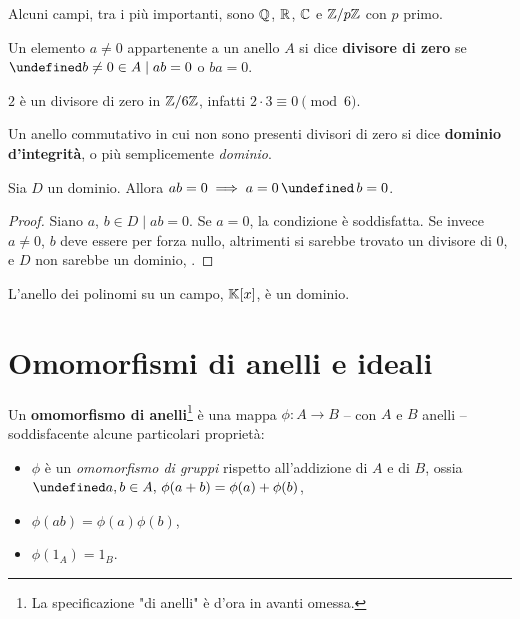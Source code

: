 \documentclass[a4paper]{article}
\let\oldforall\forall
\let\forall\undefined
\DeclareMathOperator{\forall}{\oldforall}
\let\oldexists\exists
\let\exists\undefined
\DeclareMathOperator{\exists}{\oldexists}
\let\oldlor\lor
\let\lor\undefined
\DeclareMathOperator{\lor}{\oldlor}
\begin{document}
\begin{example}
    Alcuni campi, tra i più importanti, sono $\mathbb{Q}$, $\mathbb{R}$, $\mathbb{C}$ e $\mathbb{Z}/p\mathbb{Z}$ con
    $p$ primo.
\end{example}

\begin{definition}
    Un elemento $a \neq 0$ appartenente a un anello $A$ si dice \textbf{divisore di zero} se
    $\exists b \neq 0 \in A \mid ab = 0$ o $ba = 0$.
\end{definition}

\begin{example}
    $2$ è un divisore di zero in $\mathbb{Z}/6\mathbb{Z}$, infatti $2 \cdot 3 \equiv 0 \pmod 6.$
\end{example}

\begin{definition}
    Un anello commutativo in cui non sono presenti divisori di zero si dice \textbf{dominio d'integrità},
    o più semplicemente \textit{dominio}.
\end{definition}

\begin{proposition}
    Sia $D$ un dominio. Allora $ab=0 \implies a=0 \,\lor\, b=0$.
\end{proposition}

\begin{proof}
    Siano $a$, $b \in D \mid ab = 0$. Se $a=0$, la condizione è soddisfatta.
    Se invece $a \neq 0$, $b$ deve essere per forza nullo, altrimenti si
    sarebbe trovato un divisore di $0$, e $D$ non sarebbe un dominio, \Lightning.
\end{proof}

\begin{example}
    L'anello dei polinomi su un campo, $\mathbb{K}[x]$, è un dominio.
\end{example}

\section{Omomorfismi di anelli e ideali}

\begin{definition}
    Un \textbf{omomorfismo di anelli}\footnote{La specificazione "di anelli" è d'ora in avanti omessa.} è una mappa $\phi : A \to B$ -- con
    $A$ e $B$ anelli -- soddisfacente alcune particolari proprietà:

    \begin{itemize}
        \item $\phi$ è un \textit{omomorfismo di gruppi} rispetto all'addizione
              di $A$ e di $B$, ossia $\forall a, b \in A, \, \phi(a+b)=\phi(a)+\phi(b)$,
        \item $\phi(ab)=\phi(a)\phi(b)$,
        \item $\phi(1_A)=1_B$.
    \end{itemize}
\end{definition}
\end{document}
